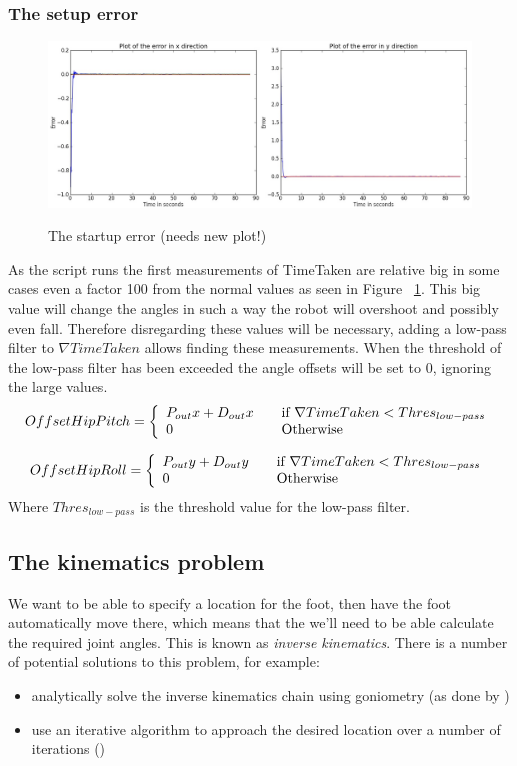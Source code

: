 \documentclass[a4paper]{article}
\begin{document}
\subsubsection{The setup error}
\begin{figure}[h]
	\centering
	\includegraphics[width=\linewidth]{pics/startupError.jpg}
	\label{fig:startup_error_plot}
	\caption{The startup error (needs new plot!)}
\end{figure} 
As the script runs the first measurements of TimeTaken are relative big in some cases even a factor 100 from the normal values as seen in Figure ~\ref{fig:startup_error_plot}. This big value will change the angles in such a way the robot will overshoot and possibly even fall.
Therefore disregarding these values will be necessary, adding a low-pass filter to $\nabla TimeTaken$ allows finding these measurements. When the threshold of the low-pass filter has been exceeded the angle offsets will be set to 0, ignoring the large values.
\[
  Offset Hip Pitch = \left\{ 
  \begin{array}{l l}
     P_{out}x + D_{out}x& \quad \text{if $\nabla TimeTaken < Thres_{low-pass}$}\\ 
    0 & \quad \text{Otherwise}\\
  \end{array} \right.
\]

\[
  Offset Hip Roll = \left\{ 
  \begin{array}{l l}
     P_{out}y + D_{out}y& \quad \text{if $\nabla TimeTaken < Thres_{low-pass}$}\\ 
    0 & \quad \text{Otherwise}\\
  \end{array} \right.
\]
Where $Thres_{low-pass}$ is the threshold value for the low-pass filter.

\subsection{The kinematics problem}
\label{sec:ik}
We want to be able to specify a location for the foot, then have the foot
automatically move there, which means that the we'll need to be able calculate
the required joint angles. This is known as \emph{inverse kinematics}. There is
a number of potential solutions to this problem, for example: 
\begin{itemize}
\item analytically solve the inverse kinematics chain using goniometry (as done by \cite{Graf2009})
\item use an iterative algorithm to approach the desired location over a number
  of iterations (\cite{Buss2009})
\end{itemize}
\end{document}
